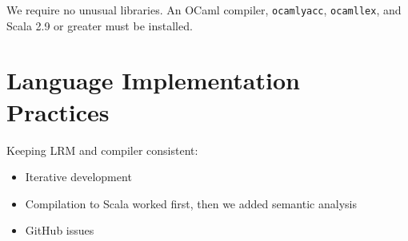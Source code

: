 We require no unusual libraries. An OCaml compiler, \verb$ocamlyacc$,
\verb$ocamllex$, and Scala 2.9 or greater must be installed.

\section{Language Implementation Practices}
Keeping LRM and compiler consistent:
\begin{itemize}
	\item{Iterative development}
	\item{Compilation to Scala worked first, then we added semantic analysis}
	\item{GitHub issues}
\end{itemize}
